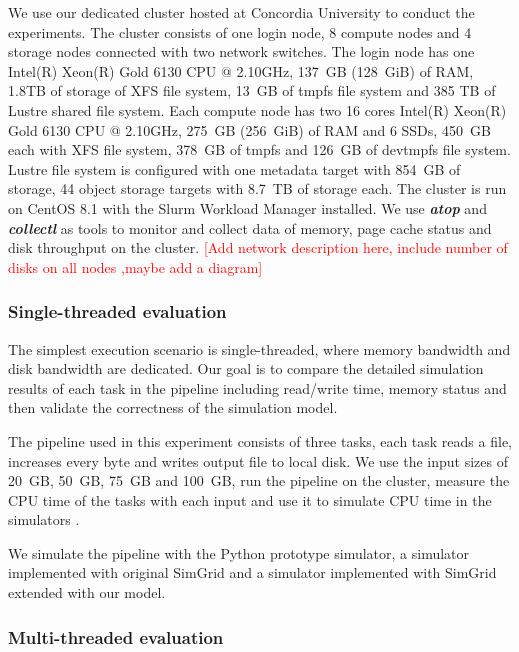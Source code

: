 \documentclass[conference]{IEEEtran}
\begin{document}
			We use our dedicated cluster hosted at Concordia University to conduct 
			the experiments. The cluster consists of one login node, 8 compute nodes 
			and 4 storage nodes connected with two network switches. The login node 
			has one Intel(R) Xeon(R) Gold 6130 CPU @ 2.10GHz, 137~GB (128~GiB) of RAM, 
			1.8TB of storage of XFS file system, 13~GB of tmpfs file system and 385 TB of 
			Lustre shared file system. Each compute node has two 16 cores Intel(R) 
			Xeon(R) Gold 6130 CPU @ 2.10GHz, 275~GB (256~GiB) of RAM and 6 SSDs, 
			450~GB each with XFS file system, 378~GB of tmpfs and 126~GB of devtmpfs file system.
			Lustre file system is configured with one metadata target with 854~GB 
			of storage, 44 object storage targets with 8.7~TB of storage each. 
			The cluster is run on CentOS 8.1 with the Slurm Workload Manager installed. 
			We use \textbf{\textit{atop}} and \textbf{\textit{collectl}} as tools to 
			monitor and collect data of memory, page cache status and disk throughput 
			on the cluster. 
			\textcolor{red}{[Add network description here, include number of disks 
			on all nodes ,maybe add a diagram]}
			
			\subsubsection{Single-threaded evaluation}
			
			The simplest execution scenario is single-threaded, where memory 
			bandwidth and disk bandwidth are dedicated. Our goal is to 
			compare the detailed simulation results of each task in the pipeline 
			including read/write time, memory status and then validate the correctness 
			of the simulation model. 

			The pipeline used in this experiment consists of three tasks, 
			each task reads a file, increases every byte and writes output file 
			to local disk. 
			We use the input sizes of 20~GB, 50~GB, 75~GB and 100~GB, run 
			the pipeline on the cluster, measure the CPU time of the tasks  
			with each input and use it to simulate CPU time in the simulators .

			We simulate the pipeline with the Python prototype simulator, 
			a simulator implemented with original SimGrid and a simulator implemented 
			with SimGrid extended with our model.  
			
			\subsubsection{Multi-threaded evaluation}
\end{document}
